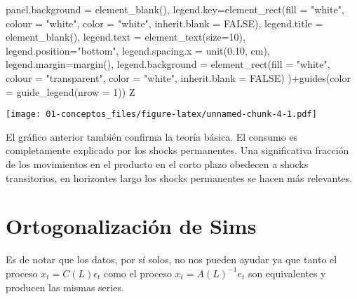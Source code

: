 \documentclass[
]{book}
\newenvironment{Shaded}{\begin{snugshade}}{\end{snugshade}}
\newcommand{\AttributeTok}[1]{\textcolor[rgb]{0.77,0.63,0.00}{#1}}
\newcommand{\ConstantTok}[1]{\textcolor[rgb]{0.00,0.00,0.00}{#1}}
\newcommand{\DecValTok}[1]{\textcolor[rgb]{0.00,0.00,0.81}{#1}}
\newcommand{\FloatTok}[1]{\textcolor[rgb]{0.00,0.00,0.81}{#1}}
\newcommand{\FunctionTok}[1]{\textcolor[rgb]{0.00,0.00,0.00}{#1}}
\newcommand{\NormalTok}[1]{#1}
\newcommand{\SpecialCharTok}[1]{\textcolor[rgb]{0.00,0.00,0.00}{#1}}
\newcommand{\StringTok}[1]{\textcolor[rgb]{0.31,0.60,0.02}{#1}}
\begin{document}
\begin{Shaded}
\begin{Highlighting}[]
           \AttributeTok{panel.background =} \FunctionTok{element\_blank}\NormalTok{(),}
           \AttributeTok{legend.key=}\FunctionTok{element\_rect}\NormalTok{(}\AttributeTok{fill =} \StringTok{"white"}\NormalTok{, }\AttributeTok{colour =} \StringTok{"white"}\NormalTok{,}
                                   \AttributeTok{color =} \StringTok{"white"}\NormalTok{, }\AttributeTok{inherit.blank =} \ConstantTok{FALSE}\NormalTok{),}
           \AttributeTok{legend.title =} \FunctionTok{element\_blank}\NormalTok{(),}
           \AttributeTok{legend.text  =} \FunctionTok{element\_text}\NormalTok{(}\AttributeTok{size=}\DecValTok{10}\NormalTok{),}
           \AttributeTok{legend.position=}\StringTok{"bottom"}\NormalTok{,}
           \AttributeTok{legend.spacing.x =} \FunctionTok{unit}\NormalTok{(}\FloatTok{0.10}\NormalTok{, }\StringTok{\textquotesingle{}cm\textquotesingle{}}\NormalTok{),}
           \AttributeTok{legend.margin=}\FunctionTok{margin}\NormalTok{(),}
           \AttributeTok{legend.background =} \FunctionTok{element\_rect}\NormalTok{(}\AttributeTok{fill =} \StringTok{"white"}\NormalTok{, }\AttributeTok{colour =} \StringTok{"transparent"}\NormalTok{,}
                                            \AttributeTok{color =} \StringTok{"white"}\NormalTok{, }\AttributeTok{inherit.blank =} \ConstantTok{FALSE}\NormalTok{)}
\NormalTok{)}\SpecialCharTok{+}\FunctionTok{guides}\NormalTok{(}\AttributeTok{color =} \FunctionTok{guide\_legend}\NormalTok{(}\AttributeTok{nrow =} \DecValTok{1}\NormalTok{))}
\NormalTok{Z}
\end{Highlighting}
\end{Shaded}

\texttt{[image: 01-conceptos\_files/figure-latex/unnamed-chunk-4-1.pdf]}

El gráfico anterior también confirma la teoría básica. El consumo es completamente explicado por los shocks permanentes. Una significativa fracción de los movimientos en el producto en el corto plazo obedecen a shocks transitorios, en horizontes largo los shocks permanentes se hacen más relevantes.

\hypertarget{ortogonalizaciuxf3n-de-sims}{%
\section{Ortogonalización de Sims}\label{ortogonalizaciuxf3n-de-sims}}

Es de notar que los datos, por sí solos, no nos pueden ayudar ya que tanto el proceso \(x_{t}=C(L)\epsilon_{t}\) como el proceso \(x_{t}=A(L)^{-1}e_{t}\) son equivalentes y producen las mismas series.
\end{document}
